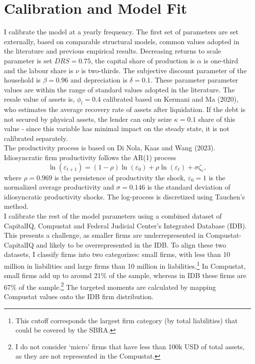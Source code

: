 \documentclass[12pt]{article}
\begin{document}
\section{Calibration and Model Fit}
I calibrate the model at a yearly frequency. The first set of parameters are set externally, based on comparable structural models, common values adopted in the literature and previous empirical results. Decreasing returns to scale parameter is set $DRS = 0.75$, the capital share of production is $\alpha$ is one-third and the labour share is $\nu$ is two-thirds. The subjective discount parameter of the household is $\beta = 0.96$ and depreciation is $\delta = 0.1$. These parameter parameter values are within the range of standard values adopted in the literature. The resale value of assets is, $\phi_l = 0.4$ calibrated based on Kermani and Ma (2020), who estimates the average recovery rate of assets after liquidation. If the debt is not secured by physical assets, the lender can only seize $\kappa = 0.1$ share of this value - since this variable has minimal impact on the steady state, it is not calibrated separately. \vspace{3mm} \\
The productivity process is based on Di Nola, Kaas and Wang (2023). Idiosyncratic firm productivity follows the AR(1) process 
$$ \ln(\varepsilon_{t+1}) = (1-\rho) \ln(\varepsilon_0) + \rho \ln(\varepsilon_t) + \sigma \zeta_\varepsilon, $$ where 
$\rho = 0.969$ is the persistence of productivity the shock, $\varepsilon_0 = 1$ is the normalized average productivity and $\sigma = 0.146$ is the standard deviation of idiosyncratic productivity shocks.  The log-process is discretized using Tauchen's method.  \vspace{3mm} \\
I calibrate the rest of the model parameters using a combined dataset of CapitalIQ, Compustat and Federal Judicial Center's Integrated Database (IDB). This presents a challenge, as smaller firms are underrepresented in Compustat-CapitalIQ and likely to be overrepresented in the IDB. To align these two datasets, I classify firms into two categorizes: small firms, with less than 10 million in liabilities and large firms than 10 million in liabilities.\footnote{This cutoff corresponds the largest firm category (by total liabilities) that could be covered by the SBRA.} In Compustat, small firms add up to around 21\% of the sample, whereas in IDB these firms are 67\% of the sample.\footnote{I do not consider `micro' firms that have less than 100k USD of total assets, as they are not represented in the Compustat.} The targeted moments are calculated by mapping Compustat values onto the IDB firm distribution.
\end{document}
